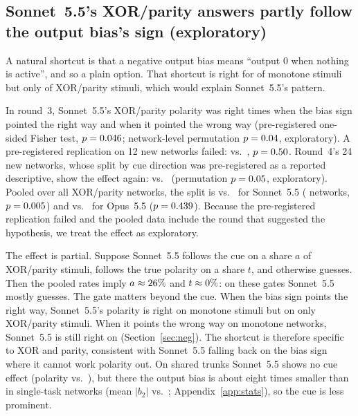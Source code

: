 \documentclass[10pt]{article}
\newcommand{\Sonnet}{Sonnet~5.5}
\newcommand{\Opus}{Opus~5.5}
\begin{document}
\subsection{\Sonnet's XOR/parity answers partly follow the output bias's sign (exploratory)}
\label{sec:cue}
A natural shortcut is that a negative output bias means ``output 0 when nothing is active'', and so a plain option. That shortcut is right for \nBaseBiasMono{} of monotone stimuli but only \nBaseBiasXL{} of XOR/parity stimuli, which would explain \Sonnet's pattern.

In round~3, \Sonnet's XOR/parity polarity was right \nDOneCueRight{} times when the bias sign pointed the right way and \nDOneCueWrong{} when it pointed the wrong way (pre-registered one-sided Fisher test, $p=0.046$; network-level permutation $p=0.04$, exploratory). A pre-registered replication on 12 new networks failed: \nEOneRight{} vs.\ \nEOneWrong{}, $p=0.50$. Round~4's 24 new networks, whose split by cue direction was pre-registered as a reported descriptive, show the effect again: \nSonCueFourRight{} vs.\ \nSonCueFourWrong{} (permutation $p=0.05$, exploratory). Pooled over all XOR/parity networks, the split is \nSonCueRight{} vs.\ \nSonCueWrong{} for \Sonnet{} (\nSonCueNets{} networks, $p=0.005$) and \nOpusCueRight{} vs.\ \nOpusCueWrong{} for \Opus{} ($p=0.439$). Because the pre-registered replication failed and the pooled data include the round that suggested the hypothesis, we treat the effect as exploratory.

The effect is partial. Suppose \Sonnet{} follows the cue on a share $a$ of XOR/parity stimuli, follows the true polarity on a share $t$, and otherwise guesses. Then the pooled rates imply $a\approx26\%$ and $t\approx0\%$: on these gates \Sonnet{} mostly guesses. The gate matters beyond the cue. When the bias sign points the right way, \Sonnet's polarity is right on \nSonMonoCueOkPol{} monotone stimuli but on only \nSonCueRight{} XOR/parity stimuli. When it points the wrong way on monotone networks, \Sonnet{} is still right on \nRFiveSonCuePol{} (Section~\ref{sec:neg}). The shortcut is therefore specific to XOR and parity, consistent with \Sonnet{} falling back on the bias sign where it cannot work polarity out. On shared trunks \Sonnet{} shows no cue effect (polarity \nSonTrCueRight{} vs.\ \nSonTrCueWrong), but there the output bias is about eight times smaller than in single-task networks (mean $|b_2|$ \nStatTrunkRBtwo{} vs.\ \nStatSingleBtwo; Appendix~\ref{app:stats}), so the cue is less prominent.
\end{document}
